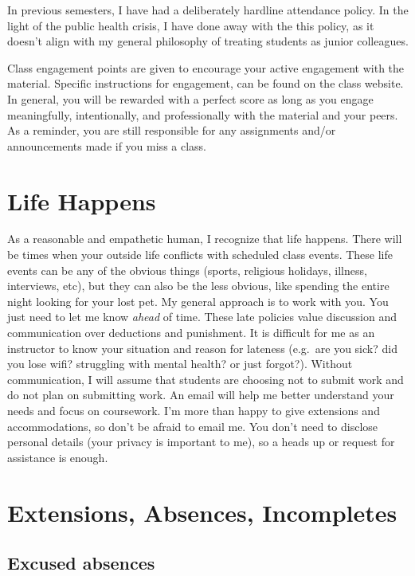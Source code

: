 In previous semesters, I have had a deliberately hardline attendance policy.
In the light of the public health crisis, I have done away with the this policy, as it doesn't align with my general philosophy of treating students as junior colleagues.

Class engagement points are given to encourage your active engagement with the material.
Specific instructions for engagement, can be found on the class website. In general, you will be rewarded with a perfect score as long as you engage meaningfully, intentionally, and professionally with the material and your peers. As a reminder, you are still responsible for any assignments and/or announcements made if you miss a class.

\hypertarget{life-happens}{%
\section{Life Happens}\label{life-happens}}

As a reasonable and empathetic human, I recognize that life happens.
There will be times when your outside life conflicts with scheduled class events.
These life events can be any of the obvious things (sports, religious holidays, illness, interviews, etc), but they can also be the less obvious, like spending the entire night looking for your lost pet.
My general approach is to work with you. You just need to let me know \emph{ahead} of time.
These late policies value discussion and communication over deductions and punishment.
It is difficult for me as an instructor to know your situation and reason for lateness (e.g.~are you sick? did you lose wifi? struggling with mental health? or just forgot?).
Without communication, I will assume that students are choosing not to submit work and do not plan on submitting work.
An email will help me better understand your needs and focus on coursework.
I'm more than happy to give extensions and accommodations, so don't be afraid to email me.
You don't need to disclose personal details (your privacy is important to me), so a heads up or request for assistance is enough.

\hypertarget{extensions-absences-incompletes}{%
\section{Extensions, Absences, Incompletes}\label{extensions-absences-incompletes}}

\hypertarget{excused-absences}{%
\subsection{Excused absences}\label{excused-absences}}

